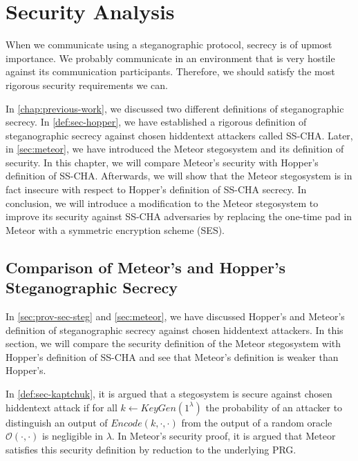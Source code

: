 \chapter{Security Analysis}
\label{chap:security}

When we communicate using a steganographic protocol, secrecy is of upmost importance.
We probably communicate in an environment that is very hostile against its communication participants.
Therefore, we should satisfy the most rigorous security requirements we can.

In \autoref{chap:previous-work}, we discussed two different definitions of steganographic secrecy.
In \autoref{def:sec-hopper}, we have established a rigorous definition of steganographic secrecy against chosen hiddentext attackers called SS-CHA.
Later, in \autoref{sec:meteor}, we have introduced the Meteor stegosystem and its definition of security.
In this chapter, we will compare Meteor's security with Hopper's definition of SS-CHA.
Afterwards, we will show that the Meteor stegosystem is in fact insecure with respect to Hopper's definition of SS-CHA secrecy.
In conclusion, we will introduce a modification to the Meteor stegosystem to improve its security against SS-CHA adversaries by replacing the one-time pad in Meteor with a symmetric encryption scheme (SES).

\section{Comparison of Meteor's and Hopper's Steganographic Secrecy}

In \autoref{sec:prov-sec-steg} and \autoref{sec:meteor}, we have discussed Hopper's and Meteor's definition of steganographic secrecy against chosen hiddentext attackers. 
In this section, we will compare the security definition of the Meteor stegosystem with Hopper's definition of SS-CHA and see that Meteor's definition is weaker than Hopper's.

In \autoref{def:sec-kaptchuk}, it is argued that a stegosystem is secure against chosen hiddentext attack if for all $k \leftarrow KeyGen(1^\lambda)$ the probability of an attacker to distinguish an output of $Encode(k, \cdot, \cdot)$ from the output of a random oracle $\mathcal{O}(\cdot, \cdot)$ is negligible in $\lambda$. In Meteor's security proof, it is argued that Meteor satisfies this security definition by reduction to the underlying PRG.


